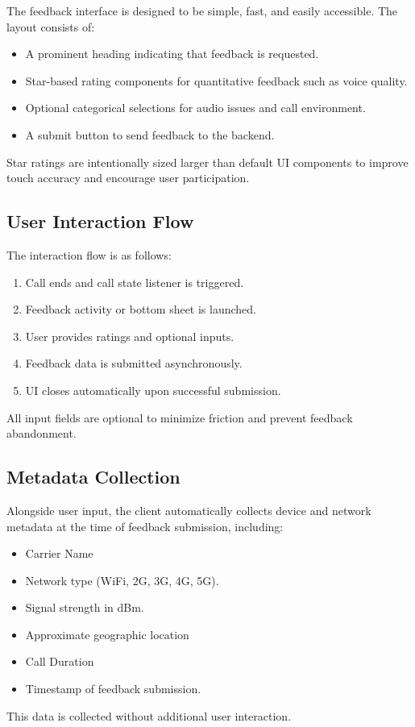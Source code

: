 \documentclass{article}
\theoremstyle{plain}
\theoremstyle{definition}
\theoremstyle{remark}
\begin{document}
The feedback interface is designed to be simple, fast, and easily accessible. The layout consists of:

\begin{itemize}
    \item A prominent heading indicating that feedback is requested.
    \item Star-based rating components for quantitative feedback such as voice quality.
    \item Optional categorical selections for audio issues and call environment.
    \item A submit button to send feedback to the backend.
\end{itemize}

Star ratings are intentionally sized larger than default UI components to improve touch accuracy and encourage user participation.

\subsection{User Interaction Flow}

The interaction flow is as follows:
\begin{enumerate}
    \item Call ends and call state listener is triggered.
    \item Feedback activity or bottom sheet is launched.
    \item User provides ratings and optional inputs.
    \item Feedback data is submitted asynchronously.
    \item UI closes automatically upon successful submission.
\end{enumerate}

All input fields are optional to minimize friction and prevent feedback abandonment.

\subsection{Metadata Collection}

Alongside user input, the client automatically collects device and network metadata at the time of feedback submission, including:
\begin{itemize}
    \item Carrier Name
    \item Network type (WiFi, 2G, 3G, 4G, 5G).
    \item Signal strength in dBm.
    \item Approximate geographic location 
    \item Call Duration
    \item Timestamp of feedback submission.
\end{itemize}
This data is collected without additional user interaction.\\
\end{document}
